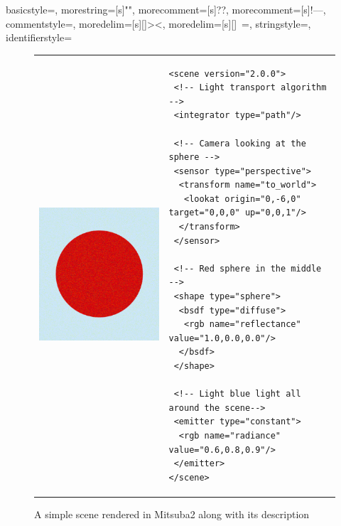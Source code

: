{
	basicstyle=\ttfamily,
	morestring=[s]{"}{"},
	morecomment=[s]{?}{?},
	morecomment=[s]{!--}{--},
	commentstyle=\color{darkgreen},
	moredelim=[s][\color{black}]{>}{<},
	moredelim=[s][\color{red}]{\ }{=},
	stringstyle=\color{blue},
	identifierstyle=\color{maroon}
}

\begin{figure}[httpb]
\begin{tabular}{p{}p{}}
\begin{minipage}{0.3\textwidth}
	\includegraphics[width=\linewidth]{img/example_scene.png}
\end{minipage}
	&
\begin{minipage}{0.6\textwidth}
	\lstset{language=XML}
	\begin{lstlisting}[basicstyle=\tiny]
<scene version="2.0.0">
 <!-- Light transport algorithm -->
 <integrator type="path"/>
	
 <!-- Camera looking at the sphere -->
 <sensor type="perspective">
  <transform name="to_world">
   <lookat origin="0,-6,0" target="0,0,0" up="0,0,1"/>
  </transform>
 </sensor>
	
 <!-- Red sphere in the middle -->
 <shape type="sphere">
  <bsdf type="diffuse">
   <rgb name="reflectance" value="1.0,0.0,0.0"/>
  </bsdf>
 </shape>
	
 <!-- Light blue light all around the scene-->
 <emitter type="constant">
  <rgb name="radiance" value="0.6,0.8,0.9"/>
 </emitter>
</scene>
	\end{lstlisting}
\end{minipage}
\end{tabular}
\caption{A simple scene rendered in Mitsuba2 along with its description}
\label{fig:example_scene}
\end{figure}

